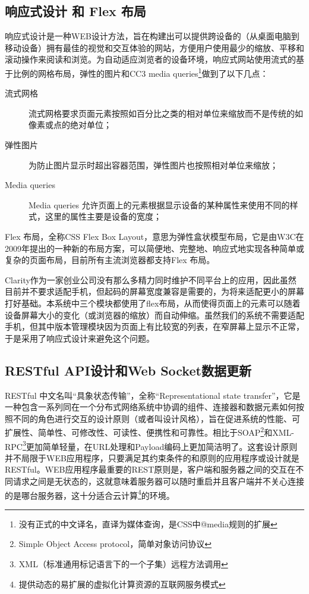 \subsection{响应式设计 和 Flex 布局}
响应式设计是一种WEB设计方法，旨在构建出可以提供跨设备的（从桌面电脑到移动设备）拥有最佳的视觉和交互体验的网站，方便用户使用最少的缩放、平移和滚动操作来阅读和浏览。\supercite{marcotte2013responsive}为自动适应浏览者的设备环境，响应式网站使用流式的基于比例的网格布局，弹性的图片和CC3 media queries\footnote{没有正式的中文译名，直译为媒体查询，是CSS中@media规则的扩展}做到了以下几点：
\begin{description}
  \item[流式网格] 流式网格要求页面元素按照如百分比之类的相对单位来缩放而不是传统的如像素或点的绝对单位；
  \item[弹性图片] 为防止图片显示时超出容器范围，弹性图片也按照相对单位来缩放；
  \item[Media queries] Media queries 允许页面上的元素根据显示设备的某种属性来使用不同的样式，这里的属性主要是设备的宽度；
\end{description}

Flex 布局，全称CSS Flex Box Layout，意思为弹性盒状模型布局，它是由W3C在2009年提出的一种新的布局方案，可以简便地、完整地、响应式地实现各种简单或复杂的页面布局，目前所有主流浏览器都支持Flex 布局。

Clarity作为一家创业公司没有那么多精力同时维护不同平台上的应用，因此虽然目前并不要求适配手机，但起码的屏幕宽度兼容是需要的，为将来适配更小的屏幕打好基础。本系统中三个模块都使用了flex布局，从而使得页面上的元素可以随着设备屏幕大小的变化（或浏览器的缩放）而自动伸缩。虽然我们的系统不需要适配手机，但其中版本管理模块因为页面上有比较宽的列表，在窄屏幕上显示不正常，于是采用了响应式设计来避免这个问题。
\subsection{RESTful API设计和Web Socket数据更新}
RESTful 中文名叫“具象状态传输”，全称“Representational state transfer”，它是一种包含一系列同在一个分布式网络系统中协调的组件、连接器和数据元素如何按照不同的角色进行交互的设计原则（或者叫设计风格），旨在促进系统的性能、可扩展性、简单性、可修改性、可读性、便携性和可靠性。\supercite{fielding2002principled,fielding2000architectural}相比于SOAP\footnote{Simple Object Access protocol，简单对象访问协议}和XML-RPC\footnote{XML（标准通用标记语言下的一个子集）远程方法调用}更加简单轻量，在URL处理和Payload编码上更加简洁明了。这套设计原则并不局限于WEB应用程序，只要满足其约束条件的和原则的应用程序或设计就是RESTful。WEB应用程序最重要的REST原则是，客户端和服务器之间的交互在不同请求之间是无状态的，这就意味着服务器可以随时重启并且客户端并不关心连接的是哪台服务器，这十分适合云计算\footnote{提供动态的易扩展的虚拟化计算资源的互联网服务模式}的环境。


